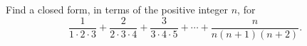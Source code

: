 Find a closed form, in terms of the positive integer $n$, for
\[\dfrac{1}{1\cdot2\cdot3}+\dfrac{2}{2\cdot3\cdot4}+\dfrac{3}{3\cdot4\cdot5}+\cdots+\dfrac{n}{n(n+1)(n+2)}.\]
